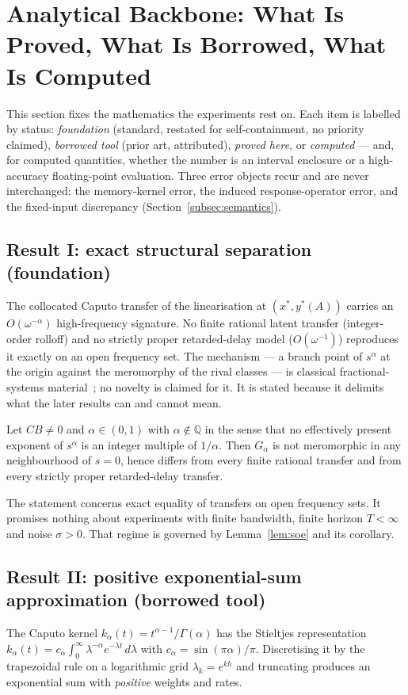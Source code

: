 \section{Analytical Backbone: What Is Proved, What Is Borrowed, What Is Computed}
\label{sec:analysis}

This section fixes the mathematics the experiments rest on. Each item is labelled by status: \emph{foundation} (standard, restated for self-containment, no priority claimed), \emph{borrowed tool} (prior art, attributed), \emph{proved here}, or \emph{computed} --- and, for computed quantities, whether the number is an interval enclosure or a high-accuracy floating-point evaluation. Three error objects recur and are never interchanged: the memory-kernel error, the induced response-operator error, and the fixed-input discrepancy (Section~\ref{subsec:semantics}).

\subsection{Result I: exact structural separation (foundation)}
The collocated Caputo transfer of the linearisation at $(x^*,y^*(A))$ carries an $O(\omega^{-\alpha})$ high-frequency signature. No finite rational latent transfer (integer-order rolloff) and no strictly proper retarded-delay model ($O(\omega^{-1})$) reproduces it exactly on an open frequency set. The mechanism --- a branch point of $s^\alpha$ at the origin against the meromorphy of the rival classes --- is classical fractional-systems material~\cite{F02,F03,F08}; no novelty is claimed for it. It is stated because it delimits what the later results can and cannot mean.

\begin{theorem}
\label{thm:T4}
Let $CB\neq0$ and $\alpha\in(0,1)$ with $\alpha\notin\mathbb{Q}$ in the sense that no effectively present exponent of $s^\alpha$ is an integer multiple of $1/\alpha$. Then $G_\alpha$ is not meromorphic in any neighbourhood of $s=0$, hence differs from every finite rational transfer and from every strictly proper retarded-delay transfer.
\end{theorem}

The statement concerns exact equality of transfers on open frequency sets. It promises nothing about experiments with finite bandwidth, finite horizon $T<\infty$ and noise $\sigma>0$. That regime is governed by Lemma~\ref{lem:soe} and its corollary.

\subsection{Result II: positive exponential-sum approximation (borrowed tool)}
\label{subsec:soe}
The Caputo kernel $k_\alpha(t)=t^{\alpha-1}/\Gamma(\alpha)$ has the Stieltjes representation $k_\alpha(t)=c_\alpha\int_0^\infty\lambda^{-\alpha}e^{-\lambda t}\,d\lambda$ with $c_\alpha=\sin(\pi\alpha)/\pi$. Discretising it by the trapezoidal rule on a logarithmic grid $\lambda_k=e^{kh}$ and truncating produces an exponential sum with \emph{positive} weights and rates.

